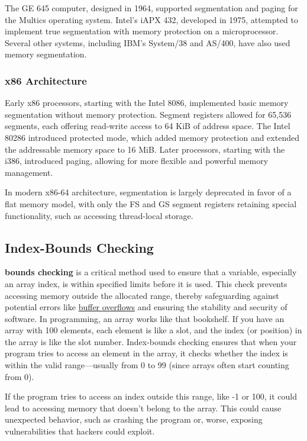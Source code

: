 \documentclass[12pt, oneside]{book}
\begin{document}
The GE 645 computer, designed in 1964, supported segmentation and paging for the Multics operating system. Intel's iAPX 432, developed in 1975, attempted to implement true segmentation with memory protection on a microprocessor. Several other systems, including IBM's System/38 and AS/400, have also used memory segmentation.

\subsubsection{x86 Architecture}
Early x86 processors, starting with the Intel 8086, implemented basic memory segmentation without memory protection. Segment registers allowed for 65,536 segments, each offering read-write access to 64 KiB of address space. The Intel 80286 introduced protected mode, which added memory protection and extended the addressable memory space to 16 MiB. Later processors, starting with the i386, introduced paging, allowing for more flexible and powerful memory management.

In modern x86-64 architecture, segmentation is largely deprecated in favor of a flat memory model, with only the FS and GS segment registers retaining special functionality, such as accessing thread-local storage.

\subsection{Index-Bounds Checking}
\textbf{bounds checking} is a critical method used to ensure that a variable, especially an array index, is within specified limits before it is used. This check prevents accessing memory outside the allocated range, thereby safeguarding against potential errors like \href{https://en.wikipedia.org/wiki/Buffer_overflow}{buffer overflows} and ensuring the stability and security of software. In programming, an array works like that bookshelf. If you have an array with 100 elements, each element is like a slot, and the index (or position) in the array is like the slot number. Index-bounds checking ensures that when your program tries to access an element in the array, it checks whether the index is within the valid range—usually from 0 to 99 (since arrays often start counting from 0). 

If the program tries to access an index outside this range, like -1 or 100, it could lead to accessing memory that doesn't belong to the array. This could cause unexpected behavior, such as crashing the program or, worse, exposing vulnerabilities that hackers could exploit.
\end{document}
